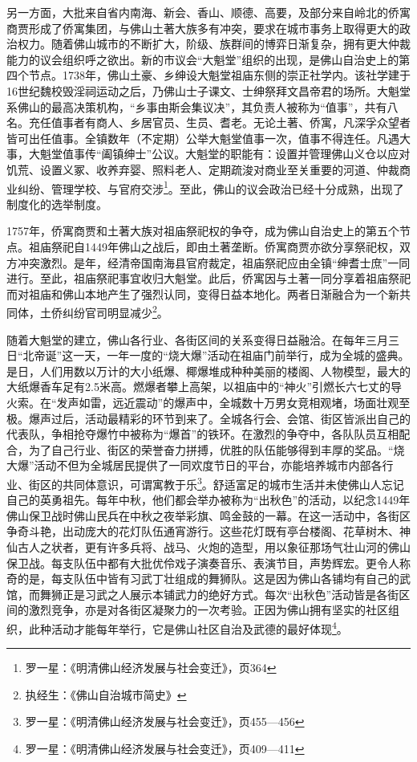 另一方面，大批来自省内南海、新会、香山、顺德、高要，及部分来自岭北的侨寓商贾形成了侨寓集团，与佛山土著大族多有冲突，要求在城市事务上取得更大的政治权力。随着佛山城市的不断扩大，阶级、族群间的博弈日渐复杂，拥有更大仲裁能力的议会组织呼之欲出。新的市议会“大魁堂”组织的出现，是佛山自治史上的第四个节点。1738年，佛山土豪、乡绅设大魁堂祖庙东侧的崇正社学内。该社学建于16世纪魏校毁淫祠运动之后，乃佛山士子课文、士绅祭拜文昌帝君的场所。大魁堂系佛山的最高决策机构，“乡事由斯会集议决”，其负责人被称为“值事”，共有八名。充任值事者有商人、乡居官员、生员、耆老。无论土著、侨寓，凡深孚众望者皆可出任值事。全镇数年（不定期）公举大魁堂值事一次，值事不得连任。凡遇大事，大魁堂值事传“阖镇绅士”公议。大魁堂的职能有：设置并管理佛山义仓以应对饥荒、设置义冢、收养弃婴、照料老人、定期疏浚对商业至关重要的河道、仲裁商业纠纷、管理学校、与官府交涉\footnote{罗一星：《明清佛山经济发展与社会变迁》，页364}。至此，佛山的议会政治已经十分成熟，出现了制度化的选举制度。

1757年，侨寓商贾和土著大族对祖庙祭祀权的争夺，成为佛山自治史上的第五个节点。祖庙祭祀自1449年佛山之战后，即由土著垄断。侨寓商贾亦欲分享祭祀权，双方冲突激烈。是年，经清帝国南海县官府裁定，祖庙祭祀应由全镇“绅耆士庶”一同进行。至此，祖庙祭祀事宜收归大魁堂。此后，侨寓因与土著一同分享着祖庙祭祀而对祖庙和佛山本地产生了强烈认同，变得日益本地化。两者日渐融合为一个新共同体，土侨纠纷官司明显减少\footnote{执经生：《佛山自治城市简史》}。

随着大魁堂的建立，佛山各行业、各街区间的关系变得日益融洽。在每年三月三日“北帝诞”这一天，一年一度的“烧大爆”活动在祖庙门前举行，成为全城的盛典。是日，人们用数以万计的大小纸爆、椰爆堆成种种美丽的楼阁、人物模型，最大的大纸爆香车足有2.5米高。燃爆者攀上高架，以祖庙中的“神火”引燃长六七丈的导火索。在“发声如雷，远近震动”的爆声中，全城数十万男女竞相观堵，场面壮观至极。爆声过后，活动最精彩的环节到来了。全城各行会、会馆、街区皆派出自己的代表队，争相抢夺爆竹中被称为“爆首”的铁环。在激烈的争夺中，各队队员互相配合，为了自己行业、街区的荣誉奋力拼搏，优胜的队伍能够得到丰厚的奖品。“烧大爆”活动不但为全城居民提供了一同欢度节日的平台，亦能培养城市内部各行业、街区的共同体意识，可谓寓教于乐\footnote{罗一星：《明清佛山经济发展与社会变迁》，页455—456}。舒适富足的城市生活并未使佛山人忘记自己的英勇祖先。每年中秋，他们都会举办被称为“出秋色”的活动，以纪念1449年佛山保卫战时佛山民兵在中秋之夜举彩旗、鸣金鼓的一幕。在这一活动中，各街区争奇斗艳，出动庞大的花灯队伍通宵游行。这些花灯既有亭台楼阁、花草树木、神仙古人之状者，更有许多兵将、战马、火炮的造型，用以象征那场气壮山河的佛山保卫战。每支队伍中都有大批优伶戏子演奏音乐、表演节目，声势辉宏。更令人称奇的是，每支队伍中皆有习武丁壮组成的舞狮队。这是因为佛山各铺均有自己的武馆，而舞狮正是习武之人展示本铺武力的绝好方式。每次“出秋色”活动皆是各街区间的激烈竞争，亦是对各街区凝聚力的一次考验。正因为佛山拥有坚实的社区组织，此种活动才能每年举行，它是佛山社区自治及武德的最好体现\footnote{罗一星：《明清佛山经济发展与社会变迁》，页409—411}。


